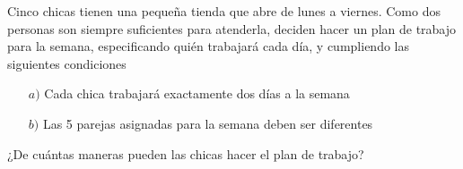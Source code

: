 Cinco chicas tienen una pequeña tienda que abre de lunes a viernes. Como dos personas son siempre suficientes para atenderla, deciden hacer un plan de trabajo para la semana, especificando quién trabajará cada día, y cumpliendo las siguientes condiciones
\begin{enumerate}
    \item[$a)$] Cada chica trabajará exactamente dos días a la semana
    \item[$b)$] Las 5 parejas asignadas para la semana deben ser diferentes
\end{enumerate}
¿De cuántas maneras pueden las chicas hacer el plan de trabajo?

